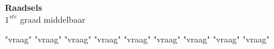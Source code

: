 \documentclass[12pt, a4paper]{article}
\begin{document}
	
	\begin{center}
		\Huge
		\textbf{Raadsels} \\
		\Large
		$1^{ste}$ graad middelbaar
	\end{center}
	
	{"vraag"}
	{"vraag"}
	{"vraag"}
	{"vraag"}
	{"vraag"}
	{"vraag"}
	{"vraag"}
	{"vraag"}
	{"vraag"}
\end{document}
